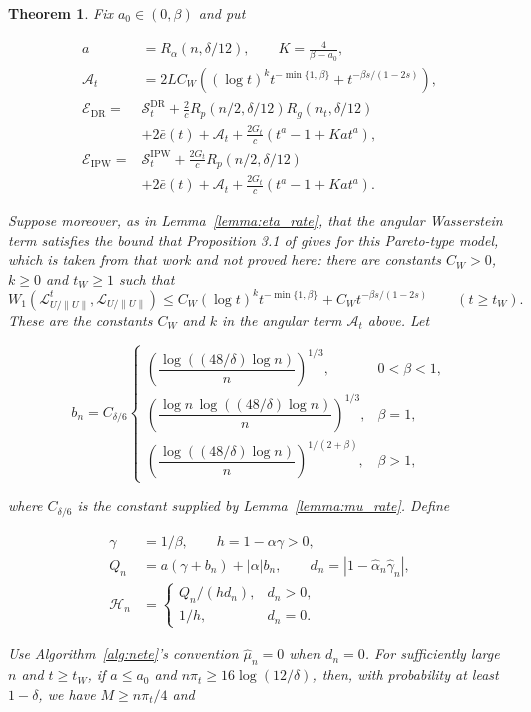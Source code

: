 \documentclass[12pt]{article}
\theoremstyle{plain}
\newtheorem{theorem}{Theorem}[section]
\theoremstyle{definition}
\begin{document}
\begin{theorem}
Fix $a_0\in(0,\beta)$ and put

\[
\begin{aligned}
a&=R_\alpha(n,\delta/12),\qquad K=\frac{4}{\beta-a_0},\\
\mathcal A_t&=2LC_W\left((\log t)^k t^{-\min\{1,\beta\}}+t^{-\beta s/(1-2s)}\right),\\
\mathcal E_{\mathrm{DR}}={}&\mathcal S_t^{\mathrm{DR}}+\frac2c R_p(n/2,\delta/12)R_g(n_t,\delta/12)\\
&+2\bar e(t)+\mathcal A_t+\frac{2G_t}{c}(t^a-1+Kat^a),\\
\mathcal E_{\mathrm{IPW}}={}&\mathcal S_t^{\mathrm{IPW}}+\frac{2G_t}{c}R_p(n/2,\delta/12)\\
&+2\bar e(t)+\mathcal A_t+\frac{2G_t}{c}(t^a-1+Kat^a).
\end{aligned}
\]

Suppose moreover, as in Lemma~\ref{lemma:eta_rate}, that the angular Wasserstein term satisfies the bound that Proposition 3.1 of \citet{zhang2023wasserstein} gives for this Pareto-type model, which is taken from that work and not proved here: there are constants $C_W>0$, $k\geq0$ and $t_W\geq1$ such that 
\[
W_1(\mathcal L_{U/\|U\|}^t,\mathcal L_{U/\|U\|})\leq C_W(\log t)^k t^{-\min\{1,\beta\}}+C_W t^{-\beta s/(1-2s)}\qquad(t\geq t_W).
\]
 These are the constants $C_W$ and $k$ in the angular term $\mathcal A_t$ above. Let

\[
b_n=C_{\delta/6}
\begin{cases}
\left(\dfrac{\log((48/\delta)\log n)}{n}\right)^{1/3},&0<\beta<1,\\
\left(\dfrac{\log n\,\log((48/\delta)\log n)}{n}\right)^{1/3},&\beta=1,\\
\left(\dfrac{\log((48/\delta)\log n)}{n}\right)^{1/(2+\beta)},&\beta>1,
\end{cases}
\]

where $C_{\delta/6}$ is the constant supplied by Lemma~\ref{lemma:mu_rate}. Define

\[
\begin{aligned}
\gamma&=1/\beta,\qquad h=1-\alpha\gamma>0,\\
Q_n&=a(\gamma+b_n)+|\alpha|b_n,\qquad d_n=|1-\hat\alpha_n\hat\gamma_n|,\\
\mathcal H_n&=
\begin{cases}
Q_n/(h d_n),&d_n>0,\\
1/h,&d_n=0.
\end{cases}
\end{aligned}
\]

Use Algorithm~\ref{alg:nete}'s convention $\hat\mu_n=0$ when $d_n=0$. For sufficiently large $n$ and $t\geq t_W$, if $a\leq a_0$ and $n\pi_t\geq16\log(12/\delta)$, then, with probability at least $1-\delta$, we have $M\geq n\pi_t/4$ and


\end{theorem}
\end{document}
